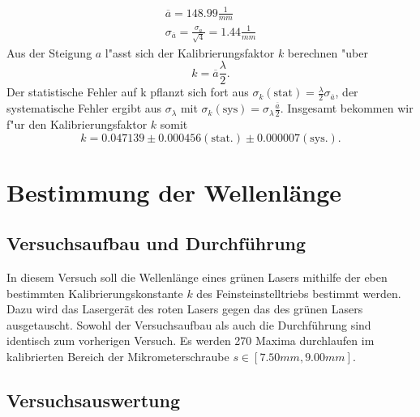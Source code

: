 \documentclass[12pt,a4paper]{article}
\begin{document}
\begin{align}
\overline{a}=148.99\frac{1}{mm}\\
\sigma_{\overline{a}}=\frac{\sigma_{a}}{\sqrt{4}}=1.44\frac{1}{mm}
\end{align}
Aus der Steigung  $a$ l"asst sich der Kalibrierungsfaktor $k$ berechnen "uber 
\begin{equation}
k=\overline{a}\frac{\lambda}{2}.
\end{equation}
Der statistische Fehler auf k pflanzt sich fort aus $\sigma_k(\text{stat})=\frac{\lambda}{2}\sigma_{\overline{a}}$, der systematische Fehler ergibt aus $\sigma_{\lambda}$ mit $\sigma_k(\text{sys})=\sigma_{\lambda}\frac{\overline{a}}{2}$. Insgesamt bekommen wir f"ur den Kalibrierungsfaktor $k$ somit
\begin{equation}
k=0.047139\pm0.000456(\text{stat.})\pm0.000007(\text{sys.}).
\end{equation}


\section{Bestimmung der Wellenlänge}
\subsection{Versuchsaufbau und Durchführung}
In diesem Versuch soll die Wellenlänge eines grünen Lasers mithilfe der eben bestimmten Kalibrierungskonstante $k$ des Feinsteinstelltriebs bestimmt werden. Dazu wird das Lasergerät des roten Lasers gegen das des grünen Lasers ausgetauscht. Sowohl der Versuchsaufbau als auch die Durchführung sind identisch zum vorherigen Versuch. Es werden 270 Maxima durchlaufen im kalibrierten Bereich der Mikrometerschraube $s\in[7.50mm,9.00mm]$.
\subsection{Versuchsauswertung}
\end{document}
